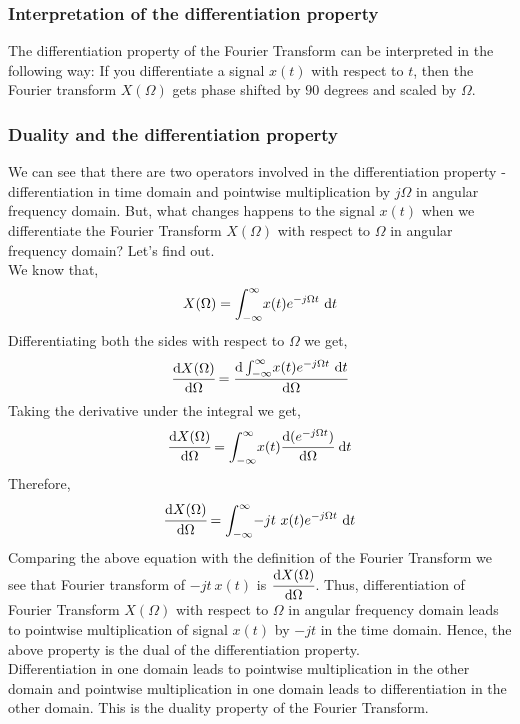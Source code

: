 \subsubsection{Interpretation of the differentiation property}
	The differentiation property of the Fourier Transform can be interpreted in the following way: If you differentiate a signal $x(t)$ with respect to $t$, then the Fourier transform $X(\Omega)$ gets phase shifted by $90$ degrees and scaled by $\Omega$.
\subsubsection{Duality and the differentiation property}
\noindent
We can see that there are two operators involved in the differentiation property - differentiation in time domain and pointwise multiplication by $j\Omega$ in angular frequency domain.
But, what changes happens to the signal $x(t)$ when we differentiate the Fourier Transform $X(\Omega)$ with respect to $\Omega$ in angular frequency domain? Let's find out.\\
We know that,
\begin{equation*}
	X(\Omega) = \int_{-\infty}^{\infty} \! x(t)e^{-j\Omega t} \ \mathrm{d} t
\end{equation*}
Differentiating both the sides with respect to $\Omega$ we get,
\begin{equation*}
	\cfrac{\mathrm{d} X(\Omega)}{\mathrm{d} \Omega} = \cfrac{\mathrm{d} \int_{-\infty}^{\infty} \! x(t)e^{-j\Omega t} \ \mathrm{d} t}{ \mathrm{d} \Omega}
\end{equation*}
Taking the derivative under the integral we get,
\begin{equation*}
	\cfrac{\mathrm{d} X(\Omega)}{\mathrm{d} \Omega} = \int_{-\infty}^{\infty} \! x(t)\cfrac{\mathrm{d} ( e^{-j\Omega t} ) }{\mathrm{d} \Omega} \ \mathrm{d} t
\end{equation*}
Therefore,
\begin{equation*}
	\cfrac{\mathrm{d} X(\Omega)}{\mathrm{d} \Omega} = \int_{-\infty}^{\infty} \! -j t \ x(t)e^{-j\Omega t} \ \mathrm{d} t
\end{equation*}
Comparing the above equation with the definition of the Fourier Transform we see that Fourier transform of $-jt \ x(t)$ is $\cfrac{\mathrm{d} X(\Omega)}{\mathrm{d} \Omega}$. Thus, differentiation of Fourier Transform $X(\Omega)$ with respect to $\Omega$ in angular frequency domain leads to pointwise multiplication of signal $x(t)$ by $-jt$ in the time domain. Hence, the above property is the dual of the differentiation property.\\
Differentiation in one domain leads to pointwise multiplication in the other domain and pointwise multiplication in one domain leads to differentiation in the other domain. This is the duality property of the Fourier Transform.